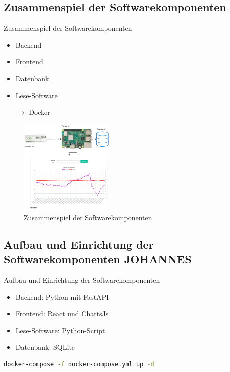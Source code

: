 \documentclass[10pt,ngerman]{beamer}
\begin{document}
\subsection{Zusammenspiel der Softwarekomponenten}

\begin{frame}[fragile]{Zusammenspiel der Softwarekomponenten}

  \begin{minipage}[t]{0.29\textwidth}
    \begin{itemize}
      \item Backend
      \item Frontend
      \item Datenbank
      \item Lese-Software
      \item[$\rightarrow$] Docker
    \end{itemize}
  \end{minipage}
  \begin{minipage}[t]{0.69\textwidth}
    \begin{figure}
      \centering
      \captionsetup{justification=centering}
      \includegraphics[width=170px]{pictures/SoftwareZusammenspiel.png}
      \caption{Zusammenspiel der Softwarekomponenten}
    \end{figure}
  \end{minipage}
\end{frame}

\subsection{Aufbau und Einrichtung der Softwarekomponenten JOHANNES}

\begin{frame}[fragile]{Aufbau und Einrichtung der Softwarekomponenten}

  \begin{minipage}[t]{0.49\textwidth}
    \begin{itemize}
      \item Backend: Python mit FastAPI
      \item Frontend: React und ChartsJs
      \item Lese-Software: Python-Script
      \item Datenbank: SQLite
    \end{itemize}
  \end{minipage}

  \begin{lstlisting}[language=Bash]
    docker-compose -f docker-compose.yml up -d
  \end{lstlisting}
\end{frame}
\end{document}
